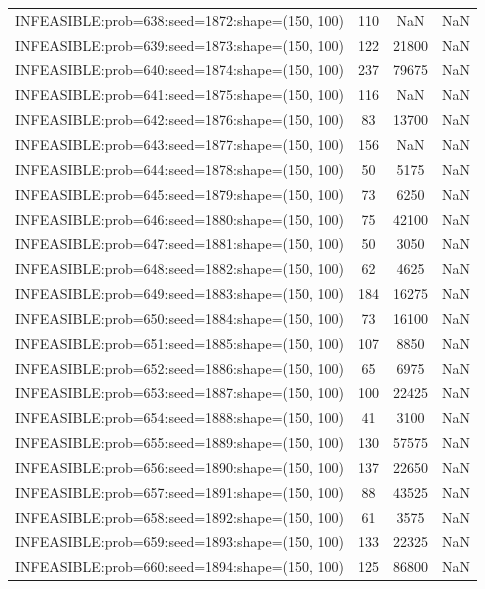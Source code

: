 \begin{longtable}{lccc}
INFEASIBLE:prob=638:seed=1872:shape=(150, 100) &   110 &   NaN &    NaN \\
INFEASIBLE:prob=639:seed=1873:shape=(150, 100) &   122 & 21800 &    NaN \\
INFEASIBLE:prob=640:seed=1874:shape=(150, 100) &   237 & 79675 &    NaN \\
INFEASIBLE:prob=641:seed=1875:shape=(150, 100) &   116 &   NaN &    NaN \\
INFEASIBLE:prob=642:seed=1876:shape=(150, 100) &    83 & 13700 &    NaN \\
INFEASIBLE:prob=643:seed=1877:shape=(150, 100) &   156 &   NaN &    NaN \\
INFEASIBLE:prob=644:seed=1878:shape=(150, 100) &    50 &  5175 &    NaN \\
INFEASIBLE:prob=645:seed=1879:shape=(150, 100) &    73 &  6250 &    NaN \\
INFEASIBLE:prob=646:seed=1880:shape=(150, 100) &    75 & 42100 &    NaN \\
INFEASIBLE:prob=647:seed=1881:shape=(150, 100) &    50 &  3050 &    NaN \\
INFEASIBLE:prob=648:seed=1882:shape=(150, 100) &    62 &  4625 &    NaN \\
INFEASIBLE:prob=649:seed=1883:shape=(150, 100) &   184 & 16275 &    NaN \\
INFEASIBLE:prob=650:seed=1884:shape=(150, 100) &    73 & 16100 &    NaN \\
INFEASIBLE:prob=651:seed=1885:shape=(150, 100) &   107 &  8850 &    NaN \\
INFEASIBLE:prob=652:seed=1886:shape=(150, 100) &    65 &  6975 &    NaN \\
INFEASIBLE:prob=653:seed=1887:shape=(150, 100) &   100 & 22425 &    NaN \\
INFEASIBLE:prob=654:seed=1888:shape=(150, 100) &    41 &  3100 &    NaN \\
INFEASIBLE:prob=655:seed=1889:shape=(150, 100) &   130 & 57575 &    NaN \\
INFEASIBLE:prob=656:seed=1890:shape=(150, 100) &   137 & 22650 &    NaN \\
INFEASIBLE:prob=657:seed=1891:shape=(150, 100) &    88 & 43525 &    NaN \\
INFEASIBLE:prob=658:seed=1892:shape=(150, 100) &    61 &  3575 &    NaN \\
INFEASIBLE:prob=659:seed=1893:shape=(150, 100) &   133 & 22325 &    NaN \\
INFEASIBLE:prob=660:seed=1894:shape=(150, 100) &   125 & 86800 &    NaN \\

\end{longtable}
